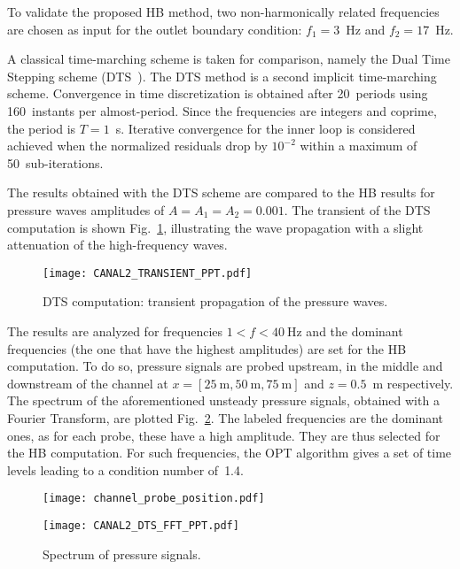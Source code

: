 To validate the proposed HB method, two non-harmonically related
frequencies are chosen as input for the outlet boundary condition:
$f_1 = 3$~Hz and $f_2 = 17$~Hz.

A classical time-marching scheme is taken for comparison, namely the
Dual Time Stepping scheme (DTS~\cite{Jameson1991}).  The DTS method is
a second implicit time-marching scheme.
Convergence in time discretization is obtained after 20~periods using
160~instants per almost-period. Since the frequencies are integers and
coprime, the period is $T=1$~s.  Iterative convergence for the
inner loop is considered achieved when the normalized residuals drop
by $10^{-2}$ within a maximum of 50~sub-iterations.

The results obtained with the DTS scheme are compared to the HB
results for pressure waves amplitudes of $A = A_1 = A_2 = 0.001$.  The
transient of the DTS computation is shown
Fig.~\ref{fig:canal2_transient}, illustrating the wave propagation
with a slight attenuation of the high-frequency waves.
\begin{figure}[htbp]
  \centering
  \texttt{[image: CANAL2\_TRANSIENT\_PPT.pdf]}
  \caption{DTS computation: transient propagation of the pressure waves.}
  \label{fig:canal2_transient}
\end{figure}


The results are analyzed for frequencies $1<f< 40~\textrm{Hz}$ and the
dominant frequencies (the one that have the highest amplitudes) are
set for the HB computation.  To do so, pressure signals are probed
upstream, in the middle and downstream of the channel at
$x=[25~\textrm{m}, 50~\textrm{m}, 75~\textrm{m}]$ and $z=0.5$~m
respectively.  The spectrum of the aforementioned unsteady pressure
signals, obtained with a Fourier Transform, are plotted
Fig.~\ref{fig:canal2_dts_fft}.  The labeled frequencies are the
dominant ones, as for each probe, these have a high amplitude. They
are thus selected for the HB computation.  For such frequencies, the
OPT algorithm gives a set of time levels leading to a condition number
of~1.4.
\begin{figure}[htb]
  \centering
  \texttt{[image: channel\_probe\_position.pdf]}

  \vspace{1em}

  \texttt{[image: CANAL2\_DTS\_FFT\_PPT.pdf]}
  \caption{Spectrum of pressure signals.}
  \label{fig:canal2_dts_fft}
\end{figure}

